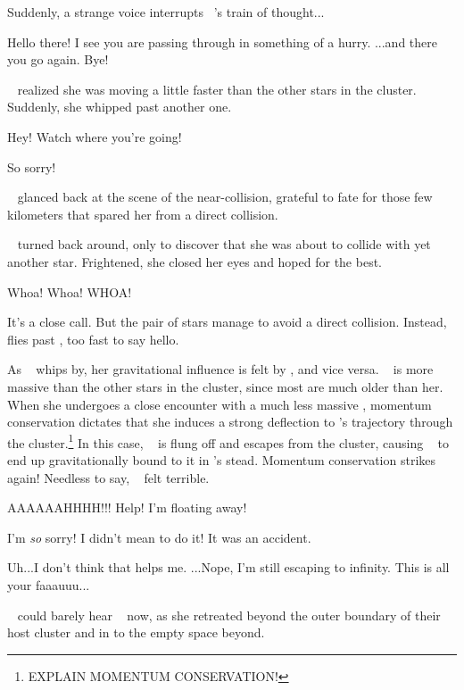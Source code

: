 \documentclass[main.tex]{subfiles}
\begin{document}
\newpara \nar Suddenly, a strange voice interrupts \rmsterope~'s train of thought...

\newpara \Jane Hello there!  I see you are passing through in something of a hurry.  ...and there you go again.  Bye!

\newpara \nar \rmsterope~ realized she was moving a little faster than the other stars in the cluster.  Suddenly, she whipped past another one.

\newpara \Dan Hey!  Watch where you're going!

\newpara \Sterope So sorry!

\newpara \nar \rmsterope~ glanced back at the scene of the near-collision, grateful to fate for those few kilometers that spared her from a direct collision.


\newpara \nar \rmsterope~ turned back around, only to discover that she was about to collide with yet another star.  Frightened, she closed her eyes and hoped for the best.  

\newpara \Louise Whoa! Whoa! WHOA!

\newpara \nar It's a close call.  But the pair of stars manage to avoid a direct collision.  Instead, \rmsterope flies past \rmlouise, too fast to say hello.

\newpara \nar As \rmsterope~ whips by, her gravitational influence is felt by \rmlouise, and vice versa.  \rmsterope~ is more massive than the other stars in the cluster, since most are much older than her.  When she undergoes a close encounter with a much less massive \rmlouise, momentum conservation dictates that she induces a strong deflection to \rmlouise's trajectory through the cluster.\footnote{EXPLAIN MOMENTUM CONSERVATION!}  In this case, \rmlouise~ is flung off and escapes from the cluster, causing \rmsterope~ to end up gravitationally bound to it in \rmlouise's stead.  Momentum conservation strikes again!  Needless to say, \rmsterope~ felt terrible.

\newpara \Louise  AAAAAAHHHH!!! Help!  I'm floating away!

\newpara \Sterope I'm \textit{so} sorry!  I didn't mean to do it!  It was an accident.  

\newpara \Louise Uh...I don't think that helps me.  ...Nope, I'm still escaping to infinity.  This is all your faaauuu...

\newpara \nar \rmsterope~ could barely hear \rmlouise~ now, as she retreated beyond the outer boundary of their host cluster and in to the empty space beyond.  
\end{document}
